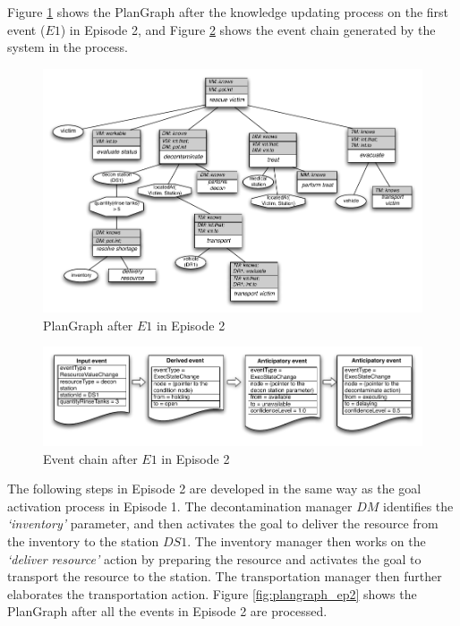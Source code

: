 Figure \ref{fig:plangraph_ep2_e1} shows the PlanGraph after the knowledge updating process on the first event ($E1$) in Episode 2, and Figure \ref{fig:eventchain_ep2_e1} shows the event chain generated by the system in the process.

\begin{figure}[htbp] %
	\centering
	\includegraphics[width=5.8in]{plangraph_ep2_e1.pdf} 
	\caption{PlanGraph after $E1$ in Episode 2}
	\label{fig:plangraph_ep2_e1}
\end{figure}

\begin{figure}[htbp] %
	\centering
	\includegraphics[width=5.8in]{eventchain_ep2_e1.pdf} 
	\caption{Event chain after $E1$ in Episode 2}
	\label{fig:eventchain_ep2_e1}
\end{figure}

The following steps in Episode 2 are developed in the same way as the goal activation process in Episode 1. The decontamination manager $DM$ identifies the \emph{`inventory'} parameter, and then activates the goal to deliver the resource from the inventory to the station $DS1$. The inventory manager then works on the \emph{`deliver resource'} action by preparing the resource and activates the goal to transport the resource to the station. The transportation manager then further elaborates the transportation action. Figure \ref{fig:plangraph_ep2} shows the PlanGraph after all the events in Episode 2 are processed.

